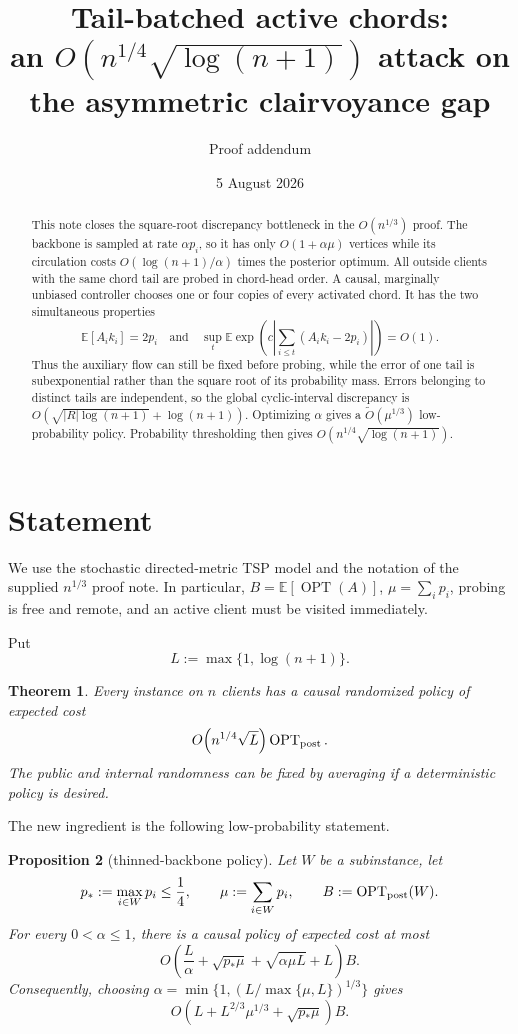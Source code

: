 \documentclass[11pt]{article}
\title{Tail-batched active chords:\\an $O(n^{1/4}\sqrt{\log(n+1)})$ attack on the asymmetric clairvoyance gap}
\author{Proof addendum}
\date{5 August 2026}
\newtheorem{theorem}{Theorem}[section]
\newtheorem{proposition}[theorem]{Proposition}
\theoremstyle{remark}
\newcommand{\E}{\mathbb E}
\newcommand{\opt}{\operatorname{OPT}}
\begin{document}
\maketitle

\begin{abstract}
This note closes the square-root discrepancy bottleneck in the
$O(n^{1/3})$ proof.  The backbone is sampled at rate $\alpha p_i$, so it has
only $O(1+\alpha\mu)$ vertices while its circulation costs
$O(\log(n+1)/\alpha)$ times the posterior optimum.  All outside clients with
the same chord tail are probed in chord-head order.  A causal, marginally
unbiased controller chooses one or four copies of every activated chord.  It
has the two simultaneous properties
\[
  \E[A_i k_i]=2p_i
  \quad\text{and}\quad
  \sup_t\E\exp\!\left(c\left|
       \sum_{i\le t}(A_i k_i-2p_i)\right|\right)=O(1).
\]
Thus the auxiliary flow can still be fixed before probing, while the error of
one tail is subexponential rather than the square root of its probability
mass.  Errors belonging to distinct tails are independent, so the global
cyclic-interval discrepancy is
$O(\sqrt{|R|\log(n+1)}+\log(n+1))$.  Optimizing $\alpha$ gives a
$\widetilde O(\mu^{1/3})$ low-probability policy.  Probability thresholding
then gives $O(n^{1/4}\sqrt{\log(n+1)})$.
\end{abstract}

\section{Statement}

We use the stochastic directed-metric TSP model and the notation of the
supplied $n^{1/3}$ proof note.  In particular, $B=\E[\opt(A)]$,
$\mu=\sum_i p_i$, probing is free and remote, and an active client must be
visited immediately.

Put
\[
  L:=\max\{1,\log(n+1)\}.
\]

\begin{theorem}\label{thm:main}
Every instance on $n$ clients has a causal randomized policy of expected cost
\[
  O\!\left(n^{1/4}\sqrt L\right)\opt_{\rm post}.
\]
The public and internal randomness can be fixed by averaging if a
deterministic policy is desired.
\end{theorem}

The new ingredient is the following low-probability statement.

\begin{proposition}[thinned-backbone policy]\label{prop:low}
Let $W$ be a subinstance, let
\[
 p_*:=\max_{i\in W}p_i\le\frac14,
 \qquad \mu:=\sum_{i\in W}p_i,
 \qquad B:=\opt_{\rm post}(W).
\]
For every $0<\alpha\le1$, there is a causal policy of expected cost at most
\begin{equation}\label{eq:low-alpha}
 O\!\left(
   \frac L\alpha+\sqrt{p_*\mu}
   +\sqrt{\alpha\mu L}+L
 \right)B.
\end{equation}
Consequently, choosing
$\alpha=\min\{1,(L/\max\{\mu,L\})^{1/3}\}$ gives
\begin{equation}\label{eq:low-optimized}
 O\!\left(L+L^{2/3}\mu^{1/3}+\sqrt{p_*\mu}\right)B.
\end{equation}
\end{proposition}
\end{document}
